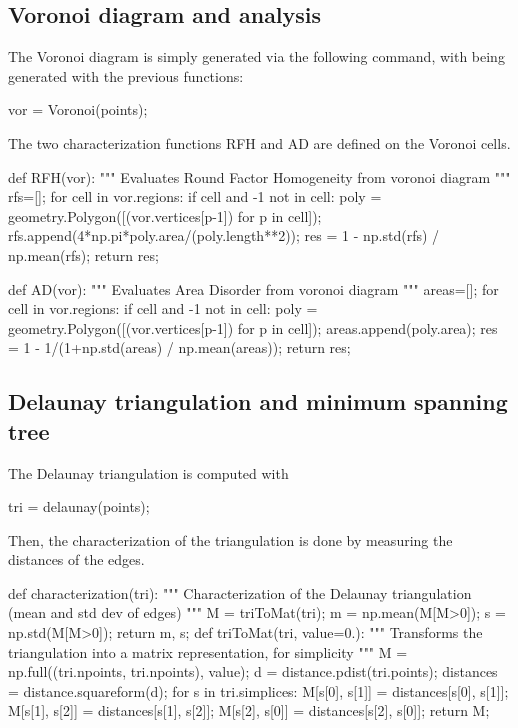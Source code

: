 \subsection{Voronoi diagram and analysis}

The Voronoi diagram is simply generated via the following command, with  being generated with the previous functions:
\begin{python}
vor = Voronoi(points);
\end{python}

The two characterization functions RFH and AD are defined on the Voronoi cells.

\begin{python}
def RFH(vor):
    """
    Evaluates Round Factor Homogeneity from voronoi diagram
    """
    rfs=[];
    for cell in vor.regions:
        if cell and -1 not in cell:
            poly = geometry.Polygon([(vor.vertices[p-1]) for p in cell]);
            rfs.append(4*np.pi*poly.area/(poly.length**2));
    res = 1 - np.std(rfs) / np.mean(rfs);            
    return res;
\end{python}

\begin{python}
def AD(vor):
    """
    Evaluates Area Disorder from voronoi diagram
    """
    areas=[];
    for cell in vor.regions:
        if cell and -1 not in cell:
            poly = geometry.Polygon([(vor.vertices[p-1]) for p in cell]);
            areas.append(poly.area);
    res = 1 - 1/(1+np.std(areas) / np.mean(areas));            
    return res;
\end{python}

\subsection{Delaunay triangulation and minimum spanning tree}
The Delaunay triangulation is computed with 
\begin{python}
tri = delaunay(points);
\end{python}
Then, the characterization of the triangulation is done by measuring the distances of the edges.
\begin{python}
def characterization(tri):
    """
    Characterization of the Delaunay triangulation (mean and std dev of edges)
    """
    M = triToMat(tri);
    m = np.mean(M[M>0]);
    s = np.std(M[M>0]);
    return m, s;
def triToMat(tri, value=0.):
    """
    Transforms the triangulation into a matrix representation, 
    for simplicity
    """
    M = np.full((tri.npoints, tri.npoints), value);
    d = distance.pdist(tri.points);
    distances = distance.squareform(d);
    for s in tri.simplices:
        M[s[0], s[1]] = distances[s[0], s[1]];
        M[s[1], s[2]] = distances[s[1], s[2]];
        M[s[2], s[0]] = distances[s[2], s[0]];
    return M;
\end{python}

